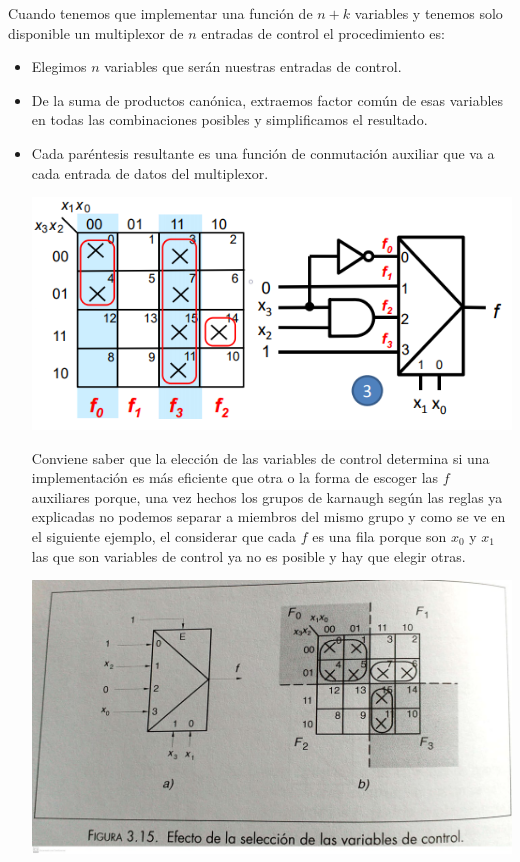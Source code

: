 \documentclass[a4paper,10pt]{book}
\begin{document}
Cuando tenemos que implementar una función de $n+k$ variables y tenemos solo disponible un multiplexor de $n$ entradas de control el procedimiento es:
\begin{itemize}
\item Elegimos $n$ variables que serán nuestras entradas de control.

\item De la suma de productos canónica, extraemos factor común de esas variables en todas las combinaciones posibles y simplificamos el resultado.

\item Cada paréntesis resultante es una función de conmutación auxiliar que va a cada entrada de datos del multiplexor.

\begin{center}
\includegraphics[scale=0.50]{aplicacion multiplexor 2}
\end{center}

Conviene saber que la elección de las variables de control determina si una implementación es más eficiente que otra o la forma de escoger las $f$ auxiliares porque, una vez hechos los grupos de karnaugh según las reglas ya explicadas no podemos separar a miembros del mismo grupo y como se ve en el siguiente ejemplo, el considerar que cada $f$ es una fila porque son $x_0$ y $x_1$ las que son variables de control ya no es posible y hay que elegir otras.

\begin{center}
\includegraphics[scale=0.17]{aplicacion multiplexor 3}
\end{center}

\end{itemize}
\end{document}
